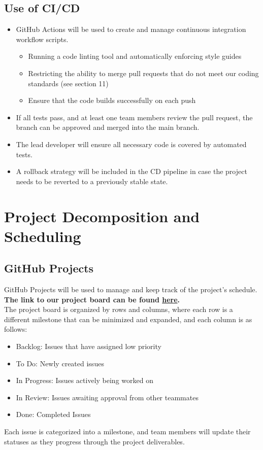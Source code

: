 \documentclass{article}
\begin{document}
\subsection{Use of CI/CD}
\begin{itemize}
	\item GitHub Actions will be used to create and manage continuous integration workflow scripts.
	\begin{itemize}
    \item Running a code linting tool and automatically enforcing style guides
    \item Restricting the ability to merge pull requests that do not meet our coding standards (see section 11)
    \item Ensure that the code builds successfully on each push
  \end{itemize}
	\item If all tests pass, and at least one team members review the pull request, the branch can be approved and merged into the main branch.
	\item The lead developer will ensure all necessary code is covered by automated tests.
	\item A rollback strategy will be included in the CD pipeline in case the project needs 
  to be reverted to a previously stable state.
\end{itemize}

\section{Project Decomposition and Scheduling}

\subsection{GitHub Projects}

GitHub Projects will be used to manage and keep track of the project's schedule. 
\textbf{The link to our project board can be found \href{https://github.com/users/parishanizam/projects/2/views/1}{here}.}\\
The project board is organized by rows and columns, where each row is a different 
milestone that can be minimized and expanded, and each column is as follows:
\begin{itemize}
  \item Backlog: Issues that have assigned low priority
  \item To Do: Newly created issues
  \item In Progress: Issues actively being worked on
  \item In Review: Issues awaiting approval from other teammates
  \item Done: Completed Issues
\end{itemize}
Each issue is categorized into a milestone, and team members will update their statuses as they 
progress through the project deliverables.
\end{document}
